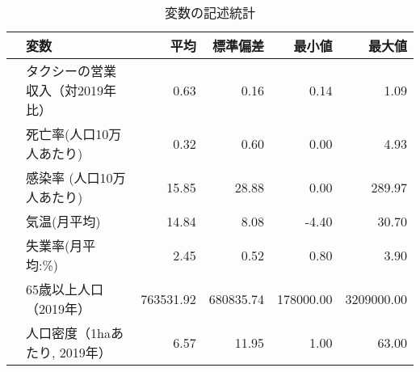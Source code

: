 \documentclass[a4paper,landscape]{jsarticle}
\begin{document}
\begin{table}
\centering
\captionsetup{labelformat=empty,labelsep=none}
\caption{変数の記述統計}
\begin{tabular}{rlrrrr}
  \hline
 & 変数 & 平均 & 標準偏差 & 最小値 & 最大値 \\ 
  \hline
 & タクシーの営業収入（対2019年比） & 0.63 & 0.16 & 0.14 & 1.09 \\ 
 & 死亡率(人口10万人あたり) & 0.32 & 0.60 & 0.00 & 4.93 \\ 
 & 感染率 (人口10万人あたり) & 15.85 & 28.88 & 0.00 & 289.97 \\ 
 & 気温(月平均) & 14.84 & 8.08 & -4.40 & 30.70 \\ 
 & 失業率(月平均:\%) & 2.45 & 0.52 & 0.80 & 3.90 \\ 
 & 65歳以上人口（2019年） & 763531.92 & 680835.74 & 178000.00 & 3209000.00 \\ 
 & 人口密度（1haあたり, 2019年） & 6.57 & 11.95 & 1.00 & 63.00 \\ 
 \hline
\end{tabular}
\label{tb-ref}
\end{table}
\end{document}
